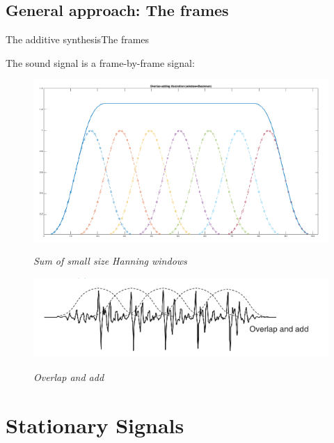 \documentclass[10pt]{beamer}
\begin{document}
\subsection{General approach: The frames}
\begin{frame}{The additive synthesis}{The frames}

The sound signal is  a frame-by-frame signal: \\

\begin{figure}

	{\includegraphics[scale=0.3]{overlap2.png}}
	\caption{\it Sum of small size Hanning windows}
\end{figure}
\begin{figure}
	{\includegraphics[scale=0.25]{overlap1.png}}
	\caption{\it Overlap and add}
\end{figure}
\end{frame}
\section{Stationary Signals}
\end{document}
